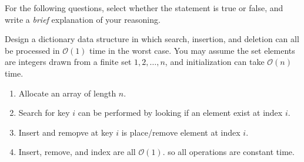 \documentclass[12pt]{exam}
\begin{document}
\begin{questions}

  \question For the following questions, select whether the statement is true or false,
  and write a \textit{brief} explanation of your reasoning.


  \clearpage

  Design a dictionary data structure in which search, insertion,
  and deletion can all be processed in $\mathcal{O}(1)$ time in the worst
  case. You may assume the set elements are integers drawn from a finite set
  $1, 2, \dots , n$, and initialization can take $\mathcal{O}(n)$ time.

  \begin{enumerate}
    \item Allocate an array of length $n$.
    \item Search for key $i$ can be performed by looking if an element exist at index $i$.
    \item Insert and remopve at key $i$ is place/remove element at index $i$.
    \item Insert, remove, and index are all $\mathcal{O}(1)$. so all operations are constant time.
  \end{enumerate}

\end{questions}
\end{document}
